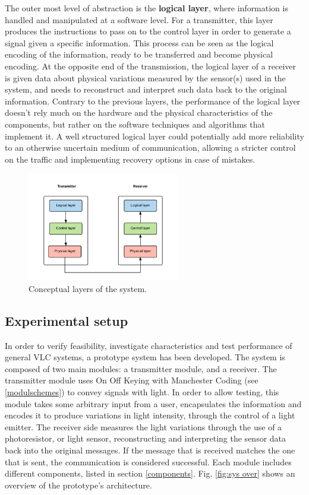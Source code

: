 The outer most level of abstraction is the \textbf{logical layer}, where information is handled and manipulated at a software level.
For a transmitter, this layer produces the instructions to pass on to the control layer in order to generate a signal given a specific information. 
This process can be seen as the logical encoding of the information, ready to be transferred and become physical encoding.
At the opposite end of the transmission, the logical layer of a receiver is given data about physical variations measured by the sensor(s) used in the system, and needs to reconstruct and interpret such data back to the original information.
Contrary to the previous layers, the performance of the logical layer doesn't rely much on the hardware and the physical characteristics of the components, but rather on the software techniques and algorithms that implement it.
A well structured logical layer could potentially add more reliability to an otherwise uncertain medium of communication, allowing a stricter control on the traffic and implementing recovery options in case of mistakes.

\begin{figure}[hbt]
  \centering
  \includegraphics[height=180px]{img/LCP}
  \caption{Conceptual layers of the system.}
  \label{fig:lcp}
\end{figure}


\subsection{Experimental setup}
\label{expsetup}
In order to verify feasibility, investigate characteristics and test performance of general VLC systems, a prototype system has been developed.
The system is composed of two main modules: a transmitter module, and a receiver.
The transmitter module uses On Off Keying with Manchester Coding (see \ref{modulschemes})  to convey signals with light.
In order to allow testing, this module takes some arbitrary input from a user, encapsulates the information and encodes it to produce variations in light intensity, through the control of a light emitter.
The receiver side measures the light variations through the use of a photoresistor, or light sensor, reconstructing and interpreting the sensor data back into the original messages. 
If the message that is received matches the one that is sent, the communication is considered successful.
Each module includes different components, listed in section \ref{components}.
Fig. \ref{fig:sys over} shows an overview of the prototype's architecture.

